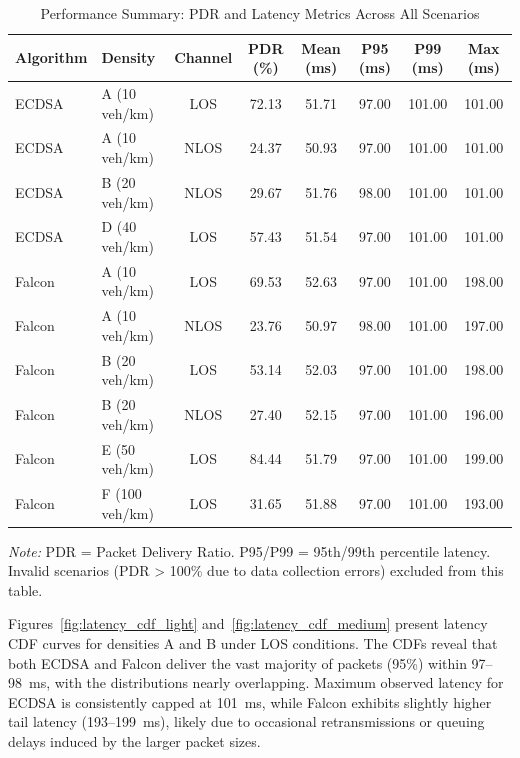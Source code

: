 \documentclass[letterpaper,journal]{IEEEtran}
\begin{document}
\begin{table}[t]
\centering
\caption{Performance Summary: PDR and Latency Metrics Across All Scenarios}
\label{tab:performance_summary}
\begin{tabular}{llcccccc}
\toprule
\textbf{Algorithm} & \textbf{Density} & \textbf{Channel} & \textbf{PDR (\%)} & \textbf{Mean (ms)} & \textbf{P95 (ms)} & \textbf{P99 (ms)} & \textbf{Max (ms)} \\
\midrule
ECDSA & A (10 veh/km) & LOS & 72.13 & 51.71 & 97.00 & 101.00 & 101.00 \\
ECDSA & A (10 veh/km) & NLOS & 24.37 & 50.93 & 97.00 & 101.00 & 101.00 \\
ECDSA & B (20 veh/km) & NLOS & 29.67 & 51.76 & 98.00 & 101.00 & 101.00 \\
ECDSA & D (40 veh/km) & LOS & 57.43 & 51.54 & 97.00 & 101.00 & 101.00 \\
\midrule
Falcon & A (10 veh/km) & LOS & 69.53 & 52.63 & 97.00 & 101.00 & 198.00 \\
Falcon & A (10 veh/km) & NLOS & 23.76 & 50.97 & 98.00 & 101.00 & 197.00 \\
Falcon & B (20 veh/km) & LOS & 53.14 & 52.03 & 97.00 & 101.00 & 198.00 \\
Falcon & B (20 veh/km) & NLOS & 27.40 & 52.15 & 97.00 & 101.00 & 196.00 \\
Falcon & E (50 veh/km) & LOS & 84.44 & 51.79 & 97.00 & 101.00 & 199.00 \\
Falcon & F (100 veh/km) & LOS & 31.65 & 51.88 & 97.00 & 101.00 & 193.00 \\
\bottomrule
\end{tabular}
\vspace{2mm}
\begin{minipage}{\textwidth}
\small
\textit{Note:} PDR = Packet Delivery Ratio. P95/P99 = 95th/99th percentile latency. Invalid scenarios (PDR > 100\% due to data collection errors) excluded from this table.
\end{minipage}
\end{table}

Figures~\ref{fig:latency_cdf_light} and~\ref{fig:latency_cdf_medium} present latency CDF curves for densities A and B under LOS conditions. The CDFs reveal that both ECDSA and Falcon deliver the vast majority of packets (95\%) within 97--98~ms, with the distributions nearly overlapping. Maximum observed latency for ECDSA is consistently capped at 101~ms, while Falcon exhibits slightly higher tail latency (193--199~ms), likely due to occasional retransmissions or queuing delays induced by the larger packet sizes.
\end{document}
